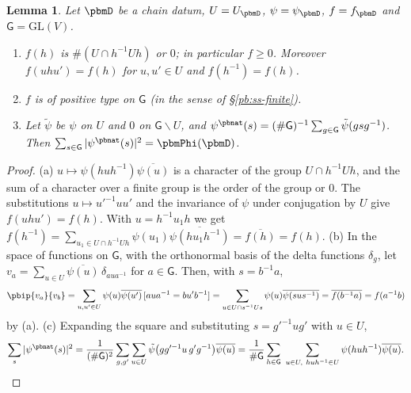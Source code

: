 \documentclass[10pt]{amsart}
\newtheorem{lemma}[theorem]{Lemma}
\theoremstyle{definition}
\theoremstyle{remark}
\providecommand{\auGL}{\mathrm{GL}}
\providecommand{\aubar}[1]{\overline{#1}}
\begin{document}
\begin{lemma}\label{pbm:pos}
Let $\pbmD$ be a chain datum, $U=U_\pbmD$, $\psi=\psi_\pbmD$, $f=f_\pbmD$ and $\mathsf G=\auGL(V)$.
\begin{enumerate}
\item[(a)] $f(h)$ is $\#(U\cap h^{-1}Uh)$ or $0$; in particular $f\ge0$. Moreover $f(uhu')=f(h)$
for $u,u'\in U$ and $f(h^{-1})=f(h)$.
\item[(b)] $f$ is of positive type on $\mathsf G$ (in the sense of \S\ref{pb:ss-finite}).
\item[(c)] Let $\tilde\psi$ be $\psi$ on $U$ and $0$ on $\mathsf G\smallsetminus U$, and
$\psi^{\pbnat}(s)=(\#\mathsf G)^{-1}\sum_{g\in\mathsf G}\tilde\psi(gsg^{-1})$. Then
$\sum_{s\in\mathsf G}|\psi^{\pbnat}(s)|^2=\pbmPhi(\pbmD)$.
\end{enumerate}
\end{lemma}
\begin{proof}
(a) $u\mapsto\psi(huh^{-1})\aubar{\psi(u)}$ is a character of the group $U\cap h^{-1}Uh$, and the
sum of a character over a finite group is the order of the group or $0$. The substitutions
$u\mapsto u'^{-1}uu'$ and the invariance of $\psi$ under conjugation by $U$ give $f(uhu')=f(h)$.
With $u=h^{-1}u_1h$ we get $f(h^{-1})=\sum_{u_1\in U\cap h^{-1}Uh}\psi(u_1)\aubar{\psi(hu_1h^{-1})}=
\aubar{f(h)}=f(h)$.
(b) In the space of functions on $\mathsf G$, with the orthonormal basis of the delta functions
$\delta_g$, let $v_a=\sum_{u\in U}\aubar{\psi(u)}\,\delta_{aua^{-1}}$ for $a\in\mathsf G$. Then, with
$s=b^{-1}a$,
\[
\pbip{v_a}{v_b}=\sum_{u,u'\in U}\psi(u)\aubar{\psi(u')}\,[aua^{-1}=bu'b^{-1}]=\sum_{u\in U\cap s^{-1}Us}
\psi(u)\aubar{\psi(sus^{-1})}=\aubar{f(b^{-1}a)}=f(a^{-1}b)
\]
by (a). (c) Expanding the square and substituting $s=g'^{-1}ug'$ with $u\in U$,
\[
\sum_s|\psi^{\pbnat}(s)|^2=\frac1{(\#\mathsf G)^2}\sum_{g,g'}\sum_{u\in U}\tilde\psi\bigl(gg'^{-1}u\,g'g^{
-1}\bigr)\aubar{\psi(u)}=\frac1{\#\mathsf G}\sum_{h\in\mathsf G}\ \sum_{u\in U,\ huh^{-1}\in U}\psi(huh^{-1})
\aubar{\psi(u)} .\qedhere
\]
\end{proof}
\end{document}
